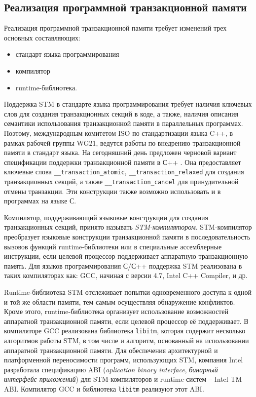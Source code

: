 \subsection{Реализация программной транзакционной памяти}
Реализация программной транзакционной памяти требует изменений трех основных составляющих:
\begin{itemize}
\item стандарт языка программирования
\item компилятор
\item runtime-библиотека.
\end{itemize} 


Поддержка STM в стандарте языка программирования требует наличия ключевых слов для создания транзакционных секций в коде, а также, наличия описания семантики использования транзакционной памяти в параллельных программах. Поэтому, международным комитетом ISO по стандартизации языка C++, в рамках рабочей группы WG21, ведутся работы по внедрению транзакционной памяти в стандарт языка. На сегодняшний день предложен черновой вариант спецификации поддержки транзакционной памяти в С++ \cite{luchango_maurer_moir}. Она предоставляет ключевые слова \texttt{\_\_transaction\_atomic}, \texttt{\_\_transaction\_relaxed} для создания транзакционных секций, а также \texttt{\_\_transaction\_cancel} для принудительной отмены транзакции. Эти конструкции также возможно использовать и в программах на языке С.

Компилятор, поддерживающий языковые конструкции для создания транзакционных секций, принято называть \textit{STM-компилятором}. STM-компилятор преобразует языковые конструкции транзакционной памяти в последовательность вызовов функций runtime-библиотеки или в специальные ассемблерные инструкции, если целевой процессор поддерживает аппаратную транзакционную память. Для языков программирования С/С++ поддержка STM реализована в таких компиляторах как: GCC, начиная с версии 4.7, Intel C++ Compiler, и др.

Runtime-библиотека STM отслеживает попытки одновременного доступа к одной и той же области памяти, тем самым осуществляя обнаружение конфликтов. Кроме этого, runtime-библиотека организует использование возможностей аппаратной транзакционной памяти, если целевой процессор её поддерживает. В компиляторе GCC реализована библиотека \texttt{libitm}, которая содержит несколько алгоритмов работы STM, в том числе и алгоритм, основанный на использовании аппаратной транзакционной памяти. Для обеспечения архитектурной и платформенной переносимости программ, использующих STM, компания Intel разработала спецификацию ABI (\textit{aplication binary interface}, \textit{бинарный интерфейс приложений}) для STM-компиляторов и runtime-систем -- Intel TM ABI. Компилятор GCC и библиотека \texttt{libitm} реализуют этот ABI.

